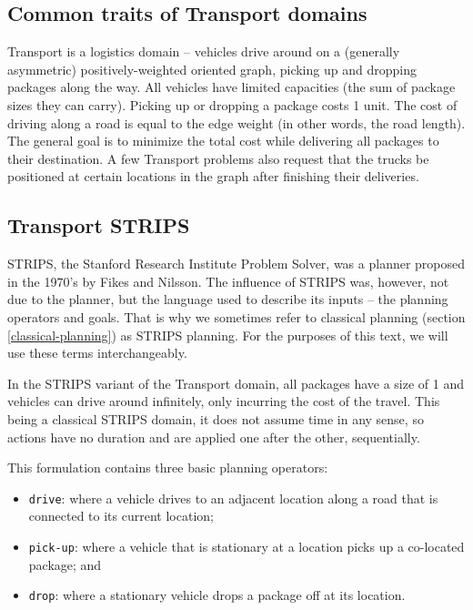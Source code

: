 \subsection{Common traits of Transport domains}

Transport is a logistics domain -- vehicles drive around on a (generally asymmetric) positively-weighted oriented graph, picking up and dropping packages along the way.
All vehicles have limited capacities (the sum of package sizes they can carry).
Picking up or dropping a package costs 1 unit. The cost of driving along a road is equal to the edge weight
(in other words, the road length).
The general goal is to minimize the total cost
while delivering all packages to their destination. A few Transport problems
also request that the trucks be positioned at certain locations in the graph
after finishing their deliveries.

\subsection{Transport STRIPS}\label{transport-strips}

STRIPS, the Stanford Research Institute Problem Solver\cite{Fikes1971},
was a planner proposed in the 1970's by Fikes and Nilsson.
The influence of STRIPS was, however, not due to the planner,
but the language used to describe its inputs -- the planning operators and goals.
That is why we sometimes refer to classical planning (section \ref{classical-planning})
as STRIPS planning. For the purposes of this text, we will use these terms interchangeably.

In the STRIPS variant of the Transport domain,
all packages have a size of 1 and vehicles can drive around infinitely,
only incurring the cost of the travel. This being a classical STRIPS domain,
it does not assume time in any sense,
so actions have no duration and are applied one after the other, sequentially.

This formulation contains three basic planning operators:

\begin{itemize}
\item \verb+drive+: where a vehicle drives to an adjacent location
along a road that is connected to its current location;
\item \verb+pick-up+: where a vehicle that is stationary at a location picks up a co-located package; and
\item \verb+drop+: where a stationary vehicle drops a package off at its location.
\end{itemize}

